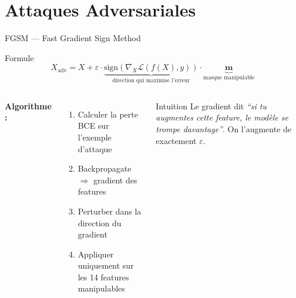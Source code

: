 \documentclass[aspectratio=169,11pt]{beamer}
\begin{document}
\section{Attaques Adversariales}

\begin{frame}{FGSM --- Fast Gradient Sign Method}
\begin{block}{Formule}
\[
X_{\text{adv}} = X + \varepsilon \cdot \underbrace{\text{sign}\!\left(\nabla_X \mathcal{L}(f(X), y)\right)}_{\text{direction qui maximise l'erreur}} \cdot \underbrace{\mathbf{m}}_{\text{masque manipulable}}
\]
\end{block}

\begin{columns}[T]
\textbf{Algorithme :}
\begin{enumerate}
    \item Calculer la perte BCE sur l'exemple d'attaque
    \item Backpropagate $\Rightarrow$ gradient des features
    \item Perturber dans la direction du gradient
    \item Appliquer uniquement sur les 14 features manipulables
\end{enumerate}

\begin{exampleblock}{Intuition}
Le gradient dit \textit{``si tu augmentes cette feature, le mod\`ele se trompe davantage''}.
On l'augmente de exactement $\varepsilon$.
\end{exampleblock}
\end{columns}
\end{frame}
\end{document}

